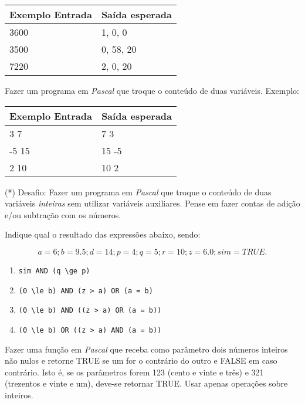 \begin{center}
\begin{tabular}{|l|l|} \hline
Exemplo Entrada & Saída esperada \\ \hline
3600            & 1, 0, 0        \\ \hline
3500            & 0, 58, 20      \\ \hline
7220            & 2, 0, 20       \\ \hline
\end{tabular}
\end{center}

\item Fazer um programa em \emph{Pascal} que troque o conteúdo de duas 
variáveis. Exemplo:

\begin{center}
\begin{tabular}{|l|l|} \hline
Exemplo Entrada & Saída esperada \\ \hline
3 7             & 7 3            \\ \hline
-5 15           & 15 -5          \\ \hline
2 10            & 10 2           \\ \hline
\end{tabular}
\end{center}

\item (*) Desafio:
Fazer um programa em \emph{Pascal}
que troque o conteúdo de duas variáveis \emph{inteiras}
sem utilizar variáveis auxiliares. Pense em fazer contas
de adição e/ou subtração com os números. 


\item Indique qual o resultado das expressões abaixo, sendo: 

\[
  a=6; b=9.5; d=14; p=4; q=5; r=10; z=6.0 ; sim= TRUE.
\]

\begin {enumerate}
\item \verb|sim AND (q \ge p)|
\item \verb|(0 \le b) AND (z > a) OR (a = b)|
\item \verb|(0 \le b) AND ((z > a) OR (a = b))|
\item \verb|(0 \le b) OR ((z > a) AND (a = b))|
\end {enumerate}


\item Fazer uma função em \emph{Pascal} que receba como parâmetro 
   dois números inteiros não nulos e retorne TRUE se um for o contrário 
   do outro e FALSE em caso contrário. Isto é, se os parâmetros forem
   123 (cento e vinte e três) e 321 (trezentos e vinte e um), deve-se 
   retornar TRUE. Usar apenas operações sobre inteiros. 

